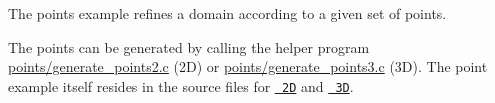 The points example refines a domain according to a given set of points.

The points can be generated by calling the helper program \mbox{\hyperlink{points_2generate_points2_8c-example}{points/generate\+\_\+points2.\+c}} (2D) or \mbox{\hyperlink{points_2generate_points3_8c-example}{points/generate\+\_\+points3.\+c}} (3D). The point example itself resides in the source files for \href{https://github.com/cburstedde/p4est/blob/master/example/points/points2.c}{\texttt{ 2D}} and \href{https://github.com/cburstedde/p4est/blob/master/example/points/points3.c}{\texttt{ 3D}}. 